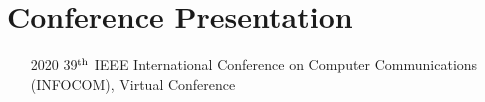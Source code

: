 \section*{Conference Presentation}

\begin{itemize}[leftmargin=4em]
    \item[2020] 39$^{\textnormal{th}}$ IEEE International Conference on Computer Communications (INFOCOM), Virtual Conference
\end{itemize}